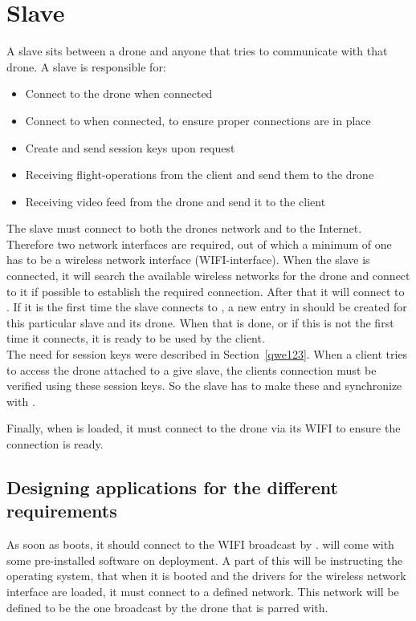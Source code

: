 \section{Slave}
\label{sec:design_slave}

A slave sits between a drone and anyone that tries to communicate with that drone. 
A slave is responsible for:

\begin{itemize}
	\item Connect to the drone when connected
	\item Connect to  when connected, to ensure proper connections are in place
	\item Create and send session keys upon request
	\item Receiving flight-operations from the client and send them to the drone
	\item Receiving video feed from the drone and send it to the client
\end{itemize}

The slave must connect to both the drones network and to the Internet. 
Therefore two network interfaces are required, out of which a minimum of one has to be a wireless network interface (WIFI-interface). 
When the slave is connected, it will search the available wireless networks for the drone and connect to it if possible to establish the required connection.
After that it will connect to . 
If it is the first time the slave connects to , a new entry in  should be created for this particular slave and its drone. 
When that is done, or if this is not the first time it connects, it is ready to be used by the client. \\

The need for session keys were described in Section~\ref{qwe123}.
When a client tries to access the drone attached to a give slave, the clients connection must be verified using these session keys. 
So the slave has to make these and synchronize with . 

Finally, when  is loaded, it must connect to the drone via its WIFI to ensure the connection is ready. \\

\subsection{Designing applications for the different requirements}
As soon as  boots, it should connect to the WIFI broadcast by . 
 will come with some pre-installed software on deployment. 
A part of this will be instructing the operating system, that when it is booted and the drivers for the wireless network interface are loaded, it must connect to a defined network.
This network will be defined to be the one broadcast by the drone that  is parred with. \\

